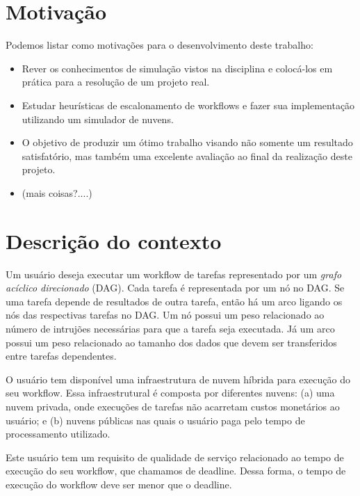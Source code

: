 \documentclass[a4paper,10pt]{article}
\begin{document}
\section{Motivação}

Podemos listar como motivações para o desenvolvimento deste trabalho:\\

\begin{itemize}

\item Rever os conhecimentos de simulação vistos na disciplina e colocá-los em prática para a resolução de um projeto real.

\item Estudar heurísticas de escalonamento de workflows e fazer sua implementação utilizando um simulador de nuvens.

\item O objetivo de produzir um ótimo trabalho visando não somente um resultado satisfatório, mas também uma excelente 
avaliação ao final da realização deste projeto.

\item (mais coisas?....)

\end{itemize}

\section{Descrição do contexto}

Um usuário deseja executar um workflow de tarefas representado por um \emph{grafo acíclico 
direcionado} (DAG). Cada tarefa é representada por um nó no DAG. Se uma tarefa depende de
resultados de outra tarefa, então há um arco ligando os nós das respectivas tarefas no DAG.
Um nó possui um peso relacionado ao número de intrujões necessárias para que a tarefa seja executada.
Já um arco possui um peso relacionado ao tamanho dos dados que devem ser transferidos entre tarefas
dependentes.

O usuário tem disponível uma infraestrutura de nuvem híbrida para execução do 
seu workflow. Essa infraestrutural é composta por diferentes nuvens: (a) uma nuvem 
privada, onde execuções de tarefas não acarretam custos monetários ao usuário; e (b) 
nuvens públicas nas quais o usuário paga pelo tempo de processamento utilizado.

Este usuário tem um requisito de qualidade de serviço relacionado 
ao tempo de execução do seu workflow, que chamamos de deadline. Dessa forma, o tempo 
de execução do workflow deve ser menor que o deadline.
\end{document}
